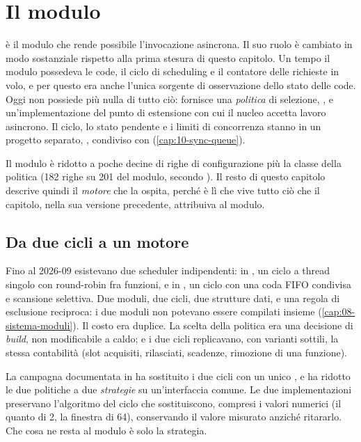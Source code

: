 \chapter{Il modulo }
\label{cap:09-async-queue}

 \`e il modulo che rende possibile l'invocazione asincrona.
Il suo ruolo \`e cambiato in modo sostanziale rispetto alla prima stesura di
questo capitolo. Un tempo il modulo possedeva le code, il ciclo di scheduling e
il contatore delle richieste in volo, e per questo era anche l'unica sorgente di
osservazione dello stato delle code. Oggi non possiede pi\`u nulla di tutto ci\`o:
fornisce una \emph{politica} di selezione, , e un'implementazione
del punto di estensione con cui il nucleo accetta lavoro asincrono. Il ciclo, lo
stato pendente e i limiti di concorrenza stanno in un progetto separato,
, condiviso con 
(\cref{cap:10-sync-queue}).

Il modulo \`e ridotto a poche decine di righe di configurazione pi\`u la classe
della politica (182 righe su 201 del modulo, secondo ). Il resto di questo capitolo descrive quindi il
\emph{motore} che la ospita, perch\'e \`e l\`i che vive tutto ci\`o che il
capitolo, nella sua versione precedente, attribuiva al modulo.

\section{Da due cicli a un motore}

Fino al 2026-09 esistevano due scheduler indipendenti:  in
, un ciclo a thread singolo con round-robin fra funzioni, e
 in , un ciclo con una coda FIFO condivisa e
scansione selettiva. Due moduli, due cicli, due strutture dati, e una regola di
esclusione reciproca: i due moduli non potevano essere compilati insieme
(\cref{cap:08-sistema-moduli}). Il costo era duplice. La scelta della politica era
una decisione di \emph{build}, non modificabile a caldo; e i due cicli replicavano,
con varianti sottili, la stessa contabilit\`a (slot acquisiti, rilasciati, scadenze,
rimozione di una funzione).

La campagna documentata in
 ha sostituito i due cicli con
un unico , e ha ridotto le due politiche a due
\emph{strategie} su un'interfaccia comune. Le due implementazioni preservano
l'algoritmo del ciclo che sostituiscono, compresi i valori numerici (il quanto di
2, la finestra di 64), conservando il valore misurato anzich\'e ritararlo.
Che cosa ne resta al modulo \`e solo la strategia.

